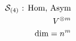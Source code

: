 \documentclass[preview]{standalone}
\begin{document}
\begin{align*}
\special{dvisvgm:raw <g id='unique000'>}\mathcal{S}_{(4)}\text{ : Hom, Asym}\\V^{\otimes m}\\\dim = n^m\special{dvisvgm:raw </g>}
\end{align*}
\end{document}
